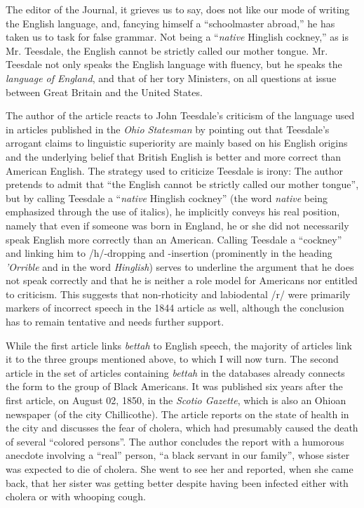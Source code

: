 \begin{ipquote}
\begin{center}
\end{center}
The editor of the Journal, it grieves us to say, do{\kern0pt}es not like our mode of writing the English language, and, fancying himself a “schoolmaster abroad,” he has taken us to task for false grammar. Not being a “\textit{native} Hinglish cockney,” as is Mr. Teesdale, the English cannot be strictly called our mother tongue. Mr. Teesdale not only speaks the English language with fluency, but he speaks the \textit{language of England}, and that of her tory Ministers, on all questions at issue between Great Britain and the United States.
\end{ipquote}


The author of the article reacts to John Teesdale’s criticism of the language used in articles published in the \emph{Ohio Statesman} by pointing out that Teesdale’s arrogant claims to linguistic superiority are mainly based on his English origins and the underlying belief that British English is better and more correct than American English. The strategy used to criticize Teesdale is irony: The author pretends to admit that “the English cannot be strictly called our mother tongue”, but by calling Teesdale a “\emph{native} Hinglish cockney” (the word \emph{native} being emphasized through the use of italics), he implicitly conveys his real position, namely that even if someone was born in England, he or she did not necessarily speak English more correctly than an American. Calling Teesdale a “cockney” and linking him to /h/-dropping and -insertion (prominently in the heading \emph{’Orrible} and in the word \emph{Hinglish}) serves to underline the argument that he does not speak correctly and that he is neither a role model for Americans nor entitled to criticism. This suggests that non-rhoticity and labiodental /r/ were primarily markers of incorrect speech in the 1844 article as well, although the conclusion has to remain tentative and needs further support.


While the first article links \emph{bettah} to English speech, the majority of articles link it to the three groups mentioned above, to which I will now turn. The second article in the set of articles containing \emph{bettah} in the databases already connects the form to the group of Black Americans. It was published six years after the first article, on August 02, 1850, in the \emph{Scotio Gazette}, which is also an Ohioan newspaper (of the city Chillicothe). The article reports on the state of health in the city and discusses the fear of cholera, which had presumably caused the death of several “colored persons”. The author concludes the report with a humorous anecdote involving a “real” person, “a black servant in our family”, whose sister was expected to die of cholera. She went to see her and reported, when she came back, that her sister was getting better despite having been infected either with cholera or with whooping cough.


